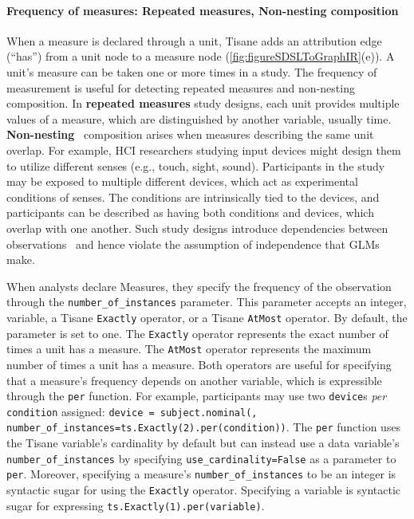 \paragraph{Frequency of measures: Repeated measures, Non-nesting composition}
\def\numberofinstances{\texttt{number\_of\_instances}\xspace}
When a measure is declared through a unit, Tisane adds an
attribution edge (``has'') from a unit node to a measure node (\autoref{fig:figureSDSLToGraphIR}(e)).
A unit's measure can be taken one or more times in a study. The frequency of
measurement is useful for detecting repeated measures and non-nesting
composition. In \textbf{repeated measures} study designs, each unit provides
multiple values of a measure, which are distinguished by another variable,
usually time. \textbf{Non-nesting}~\cite{gelmanHill2006regression} composition
arises when measures describing the same unit overlap. For example, HCI researchers studying input devices might
design them to utilize different senses (e.g., touch, sight, sound).
Participants in the study may be exposed to multiple different devices, which
act as experimental conditions of senses. The conditions are intrinsically tied to the
devices, and participants can be described as having both conditions and
devices, which overlap with one another. Such study designs
introduce dependencies between observations~\cite{clark1973language} and hence
violate the assumption of independence that GLMs make.

\def\inputdevice{\texttt{device}\xspace} When analysts declare Measures, they
specify the frequency of the observation through the
\texttt{number\_of\_instances} parameter. This parameter accepts an integer,
variable, a Tisane \texttt{Exactly} operator, or a Tisane \texttt{AtMost}
operator. By default, the parameter is set to one. The \texttt{Exactly} operator
represents the exact number of times a unit has a measure. The \texttt{AtMost}
operator represents the maximum number of times a unit has a measure. Both
operators are useful for specifying that a measure's frequency depends on
another variable, which is expressible through the \texttt{per} function. For
example, participants may use two \inputdevice{}s \textit{per}
\texttt{condition} assigned: \texttt{device = subject.nominal(, number\_of\_instances=ts.Exactly(2).per(condition))}.  The \texttt{per}
function uses the Tisane variable's cardinality by default but can instead use a
data variable's \numberofinstances by specifying \texttt{use\_cardinality=False}
as a parameter to \texttt{per}. Moreover, specifying a measure's
\texttt{number\_of\_instances} to be an integer is syntactic sugar for using the
\texttt{Exactly} operator. Specifying a variable is syntactic sugar for
expressing \texttt{ts.Exactly(1).per(variable)}.

